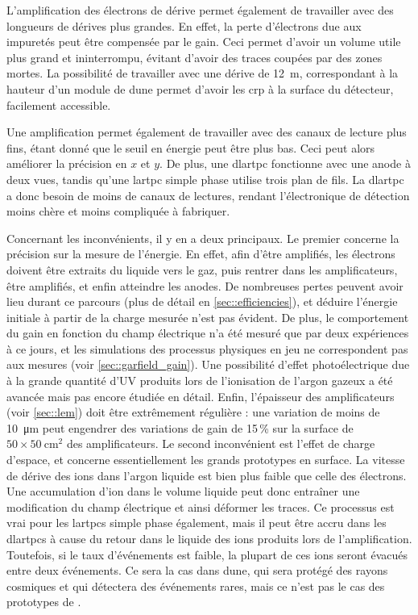       L'amplification des électrons de dérive permet également de travailler avec des longueurs de dérives plus grandes. En effet, la perte d'électrons due aux impuretés peut être compensée par le gain. Ceci permet d'avoir un volume utile plus grand et ininterrompu, évitant d'avoir des traces coupées par des zones mortes. La possibilité de travailler avec une dérive de \SI{12}{\meter}, correspondant à la hauteur d'un module de \gls{dune} permet d'avoir les \gls{crp} à la surface du détecteur, facilement accessible.

      Une amplification permet également de travailler avec des canaux de lecture plus fins, étant donné que le seuil en énergie peut être plus bas. Ceci peut alors améliorer la précision en $x$ et $y$. De plus, une \gls{dlartpc} fonctionne avec une anode à deux vues, tandis qu'une \gls{lartpc} simple phase utilise trois plan de fils. La \gls{dlartpc} a donc besoin de moins de canaux de lectures, rendant l'électronique de détection moins chère et moins compliquée à fabriquer.

      Concernant les inconvénients, il y en a deux principaux. Le premier concerne la précision sur la mesure de l'énergie. En effet, afin d'être amplifiés, les électrons doivent être extraits du liquide vers le gaz, puis rentrer dans les amplificateurs, être amplifiés, et enfin atteindre les anodes. De nombreuses pertes peuvent avoir lieu durant ce parcours (plus de détail en \autoref{sec::efficiencies}), et déduire l'énergie initiale à partir de la charge mesurée n'est pas évident. De plus, le comportement du gain en fonction du champ électrique n'a été mesuré que par deux expériences à ce jours, et les simulations des processus physiques en jeu ne correspondent pas aux mesures (voir \autoref{sec::garfield_gain}). Une possibilité d'effet photoélectrique due à la grande quantité d'UV produits lors de l'ionisation de l'argon gazeux a été avancée mais pas encore étudiée en détail. Enfin, l'épaisseur des amplificateurs (voir \autoref{sec::lem}) doit être extrêmement régulière : une variation de moins de \SI{10}{\micro\meter} peut engendrer des variations de gain de 15\,\% sur la surface de $50\times\SI{50}{\centi\meter\squared}$ des amplificateurs. Le second inconvénient est l'effet de charge d'espace, et concerne essentiellement les grands prototypes en surface. La vitesse de dérive des ions dans l'argon liquide est bien plus faible que celle des électrons. Une accumulation d'ion dans le volume liquide peut donc entraîner une modification du champ électrique et ainsi déformer les traces. Ce processus est vrai pour les \glspl{lartpc} simple phase également, mais il peut être accru dans les \glspl{dlartpc} à cause du retour dans le liquide des ions produits lors de l'amplification\cite{Romero2016}. Toutefois, si le taux d'événements est faible, la plupart de ces ions seront évacués entre deux événements. Ce sera la cas dans \gls{dune}, qui sera protégé des rayons cosmiques et qui détectera des événements rares, mais ce n'est pas le cas des prototypes de \protodp{}.


